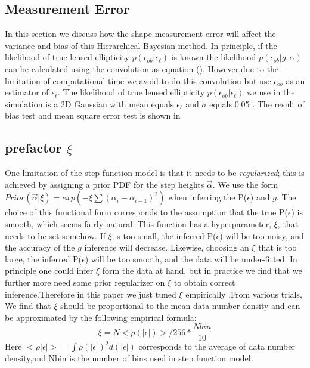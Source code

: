 \documentclass[useAMS,usenatbib]{mn2e}
\begin{document}
\subsection{Measurement Error}
In this section we  discuss how the shape measurement error will
affect the variance and bias of this Hierarchical Bayesian method.
In principle, if the likelihood of true lensed ellipticity $p(\epsilon_{ob}|\epsilon_{\ell})$
is known the likelihood $p(\epsilon_{ob}|g,\alpha)$ can be calculated using the convolution as equation ().
However,due to the limitation of computational time we avoid to do this convolution but use $\epsilon_{ob}$
as an estimator of $\epsilon_{\ell}$.
The likelihood of true lensed ellipticity $p(\epsilon_{ob}|\epsilon_{\ell})$ we use in the simulation is a 2D
Gaussian with mean equals $\epsilon_{\ell}$ and $\sigma$ equals 0.05 .
The result of bias test and mean square error test is shown in 




\subsection{prefactor $\xi$}

One limitation of the step function model is that it needs to be \textit{regularized};
this is achieved by assigning a prior PDF for the step heights $\vec{\alpha}$.
We use the form $Prior(\vec{\alpha}|\xi)=exp(-\xi\sum(\alpha_{i}-\alpha_{i-1})^{2})$
when inferring the P($\epsilon$) and $g$. The choice of this functional
form corresponds to the assumption that the true P($\epsilon$) is
smooth, which seems fairly natural. This function has a hyperparameter,
$\xi$, that needs to be set somehow. If $\xi$ is too small, the
inferred P($\epsilon$) will be too noisy, and the accuracy of the
$g$ inference will decrease. Likewise, choosing an $\xi$ that is
too large, the inferred P($\epsilon$) will be too smooth, and the
data will be under-fitted. In principle one could infer $\xi$ form
the data at hand, but in practice we find that we further more need some
prior regularizer on $\xi$ to obtain correct inference.Therefore in this paper 
we just tuned $\xi$ empirically .From various trials, We find
that $\xi$ should be proportional to the mean data number density and can
be approximated by the following empirical formula: 
\begin{equation}
\xi=N<\rho(|\epsilon|)>/256*\frac{Nbin}{10}
\end{equation}
Here $<\rho|\epsilon|>=\int\rho(|\epsilon|)^{2}d(|\epsilon|)$ corresponds
to the average of data number density,and Nbin is the number of bins used 
in step function model. 
\end{document}
